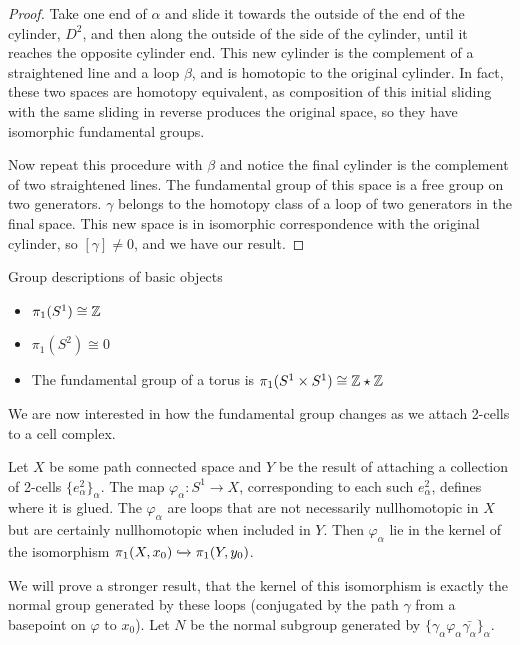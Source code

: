 \documentclass[10pt]{article}
\begin{document}
\begin{proof}
	Take one end of $\alpha$ and slide it towards the outside of the end of the
	cylinder, $D^2$, and then along the outside of the side of the cylinder,
	until it reaches the opposite cylinder end. This new cylinder is the
	complement of a straightened line and a loop $\beta$, and is homotopic to
	the original cylinder. In fact, these two spaces are homotopy equivalent, as
	composition of this initial sliding with the same sliding in reverse produces
	the original space, so they have isomorphic fundamental groups.

	Now repeat this procedure with $\beta$ and notice the
	final cylinder is the complement of two straightened lines. The fundamental
	group of this space is a free group on two generators. $\gamma$ belongs to
	the homotopy class of a loop of two generators in the final space. This new
	space is in isomorphic correspondence with the original cylinder, so
	$[\gamma] \neq 0$, and we have our result.
\end{proof}

\begin{note}Group descriptions of basic objects
	\begin{itemize}
		\item{$\pi_1(S^1) \cong \mathbb{Z}$}
		\item{$\pi_1(S^2) \cong 0$}
		\item{The fundamental group of a torus is $\pi_1(S^1 \times S^1) \cong \mathbb{Z} \star \mathbb{Z}$}
	\end{itemize}
\end{note}

We are now interested in how the fundamental group changes as we attach 2-cells
to a cell complex.

Let $X$ be some path connected space and $Y$ be the result of attaching a
collection of 2-cells $\{e^2_{\alpha}\}_{\alpha}$. The map $\varphi_{\alpha}:
S^1 \to X$, corresponding to each such $e^2_{\alpha}$, defines where it is
glued. The $\varphi_{\alpha}$ are loops that are not necessarily nullhomotopic
in $X$ but are certainly nullhomotopic when included in $Y$. Then
$\varphi_{\alpha}$ lie in the kernel of the isomorphism $\pi_1(X, x_0) \xhookrightarrow{} \pi_1(Y, y_0)$.

We will prove a stronger result, that the kernel of this isomorphism is exactly
the normal group generated by these loops (conjugated by the path $\gamma$ from
a basepoint on $\varphi$ to $x_0$). Let $N$ be the normal subgroup generated by
$\{ \gamma_{\alpha} \varphi_{\alpha} \bar{\gamma_{\alpha}}\}_{\alpha}$.
\end{document}
